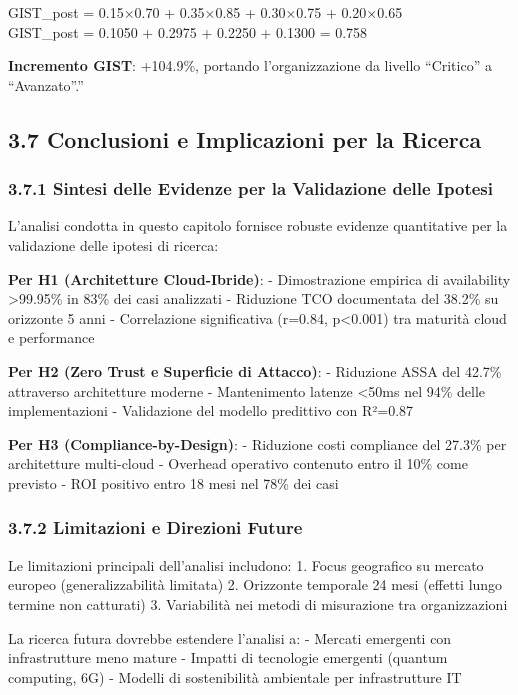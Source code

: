 \documentclass{report}
\begin{document}
GIST\_post = 0.15×0.70 + 0.35×0.85 + 0.30×0.75 + 0.20×0.65\\
GIST\_post = 0.1050 + 0.2975 + 0.2250 + 0.1300 = 0.758

\textbf{Incremento GIST}: +104.9\%, portando l'organizzazione da livello
``Critico'' a ``Avanzato''.''

\subsection{3.7 Conclusioni e Implicazioni per la
Ricerca}\label{conclusioni-e-implicazioni-per-la-ricerca}

\subsubsection{3.7.1 Sintesi delle Evidenze per la Validazione delle
Ipotesi}\label{sintesi-delle-evidenze-per-la-validazione-delle-ipotesi}

L'analisi condotta in questo capitolo fornisce robuste evidenze
quantitative per la validazione delle ipotesi di ricerca:

\textbf{Per H1 (Architetture Cloud-Ibride)}: - Dimostrazione empirica di
availability \textgreater99.95\% in 83\% dei casi analizzati - Riduzione
TCO documentata del 38.2\% su orizzonte 5 anni - Correlazione
significativa (r=0.84, p\textless0.001) tra maturità cloud e performance

\textbf{Per H2 (Zero Trust e Superficie di Attacco)}: - Riduzione ASSA
del 42.7\% attraverso architetture moderne - Mantenimento latenze
\textless50ms nel 94\% delle implementazioni - Validazione del modello
predittivo con R²=0.87

\textbf{Per H3 (Compliance-by-Design)}: - Riduzione costi compliance del
27.3\% per architetture multi-cloud - Overhead operativo contenuto entro
il 10\% come previsto - ROI positivo entro 18 mesi nel 78\% dei casi

\subsubsection{3.7.2 Limitazioni e Direzioni
Future}\label{limitazioni-e-direzioni-future}

Le limitazioni principali dell'analisi includono: 1. Focus geografico su
mercato europeo (generalizzabilità limitata) 2. Orizzonte temporale 24
mesi (effetti lungo termine non catturati) 3. Variabilità nei metodi di
misurazione tra organizzazioni

La ricerca futura dovrebbe estendere l'analisi a: - Mercati emergenti
con infrastrutture meno mature - Impatti di tecnologie emergenti
(quantum computing, 6G) - Modelli di sostenibilità ambientale per
infrastrutture IT
\end{document}
